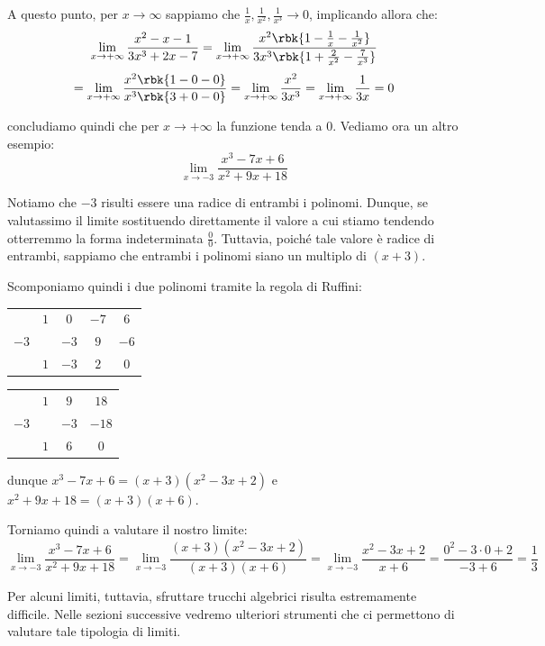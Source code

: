 \documentclass[a4paper, 12pt]{report}
\begin{document}
    A questo punto, per $x \to \infty$ sappiamo che $\frac{1}{x}, \frac{1}{x^2}, \frac{1}{x^3} \to 0$, implicando allora che:
    \[\lim_{x \to +\infty} \frac{x^2-x-1}{3x^3+2x-7} = \lim_{x \to +\infty} \frac{x^2 \rbk{1-\frac{1}{x}-\frac{1}{x^2}}}{3x^3 \rbk{1+\frac{2}{x^2}-\frac{7}{x^3}}} \]
    \[= \lim_{x \to +\infty} \frac{x^2 \rbk{1-0-0}}{x^3 \rbk{3+0-0}} = \lim_{x \to +\infty} \frac{x^2}{3x^3} = \lim_{x \to +\infty} \frac{1}{3x} = 0\]

    concludiamo quindi che per $x \to +\infty$ la funzione tenda a 0. Vediamo ora un altro esempio:
    \[\lim_{x \to -3} \frac{x^3 - 7 x + 6}{x^2 + 9 x + 18}\]

    Notiamo che $-3$ risulti essere una radice di entrambi i polinomi. Dunque, se valutassimo il limite sostituendo direttamente il valore a cui stiamo tendendo otterremmo la forma indeterminata $\frac{0}{0}$. Tuttavia, poiché tale valore è radice di entrambi, sappiamo che entrambi i polinomi siano un multiplo di $(x+3)$.
    
    Scomponiamo quindi i due polinomi tramite la regola di Ruffini:
    \begin{center}
        \begin{tabular}{c | c c c | c}
             & $1$ & $0$ & $-7$ & $6$ \\
        $-3$ &       & $-3$ & $9$ & $-6$\\
        \hline
            & $1$ & $-3$ & $2$ & $0$ \\
        \end{tabular}

        \qquad\qquad
        
        \begin{tabular}{c | c c | c}
            & $1$ & $9$ & $18$  \\
       $-3$ &       & $-3$ & $-18$\\
       \hline
           & $1$ & $6$ & $0$ \\
       \end{tabular}
    \end{center}
    dunque $x^3 - 7x + 6 = (x+3)(x^2-3x+2)$ e $x^2+9x+18 = (x+3)(x+6)$.
    
    Torniamo quindi a valutare il nostro limite:
    \[\lim_{x \to -3} \frac{x^3 - 7 x + 6}{x^2 + 9 x + 18} = \lim_{x \to -3} \frac{(x+3)(x^2-3x+2)}{(x+3)(x+6)} = \lim_{x \to -3} \frac{x^2-3x+2}{x+6} = \frac{0^2-3 \cdot 0 + 2}{-3+6} = \frac{1}{3}\]

    Per alcuni limiti, tuttavia, sfruttare trucchi algebrici risulta estremamente difficile. Nelle sezioni successive vedremo ulteriori strumenti che ci permettono di valutare tale tipologia di limiti.
\end{document}
